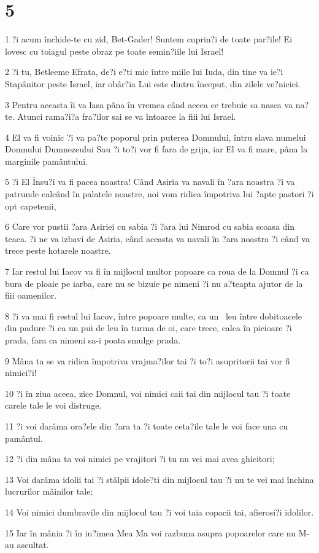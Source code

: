 \chapter{5}

\par 1 ?i acum închide-te cu zid, Bet-Gader! Suntem cuprin?i de toate par?ile! Ei lovesc cu toiagul peste obraz pe toate semin?iile lui Israel!
\par 2 ?i tu, Betleeme Efrata, de?i e?ti mic între miile lui Iuda, din tine va ie?i Stapânitor peste Israel, iar obâr?ia Lui este dintru început, din zilele ve?niciei.
\par 3 Pentru aceasta îi va lasa pâna în vremea când aceea ce trebuie sa nasca va na?te. Atunci rama?i?a fra?ilor sai se va întoarce la fiii lui Israel.
\par 4 El va fi voinic ?i va pa?te poporul prin puterea Domnului, întru slava numelui Domnului Dumnezeului Sau ?i to?i vor fi fara de grija, iar El va fi mare, pâna la marginile pamântului.
\par 5 ?i El Însu?i va fi pacea noastra! Când Asiria va navali în ?ara noastra ?i va patrunde calcând în palatele noastre, noi vom ridica împotriva lui ?apte pastori ?i opt capetenii,
\par 6 Care vor pustii ?ara Asiriei cu sabia ?i ?ara lui Nimrod cu sabia scoasa din teaca. ?i ne va izbavi de Asiria, când aceasta va navali în ?ara noastra ?i când va trece peste hotarele noastre.
\par 7 Iar restul lui Iacov va fi în mijlocul multor popoare ca roua de la Domnul ?i ca bura de ploaie pe iarba, care nu se bizuie pe nimeni ?i nu a?teapta ajutor de la fiii oamenilor.
\par 8 ?i va mai fi restul lui Iacov, între popoare multe, ca un  leu între dobitoacele din padure ?i ca un pui de leu în turma de oi, care trece, calca în picioare ?i prada, fara ca nimeni sa-i poata smulge prada.
\par 9 Mâna ta se va ridica împotriva vrajma?ilor tai ?i to?i asupritorii tai vor fi nimici?i!
\par 10 ?i în ziua aceea, zice Domnul, voi nimici caii tai din mijlocul tau ?i toate carele tale le voi distruge.
\par 11 ?i voi darâma ora?ele din ?ara ta ?i toate ceta?ile tale le voi face una cu pamântul.
\par 12 ?i din mâna ta voi nimici pe vrajitori ?i tu nu vei mai avea ghicitori;
\par 13 Voi darâma idolii tai ?i stâlpii idole?ti din mijlocul tau ?i nu te vei mai închina lucrurilor mâinilor tale;
\par 14 Voi nimici dumbravile din mijlocul tau ?i voi taia copacii tai, afierosi?i idolilor.
\par 15 Iar în mânia ?i în iu?imea Mea Ma voi razbuna asupra popoarelor care nu M-au ascultat.


